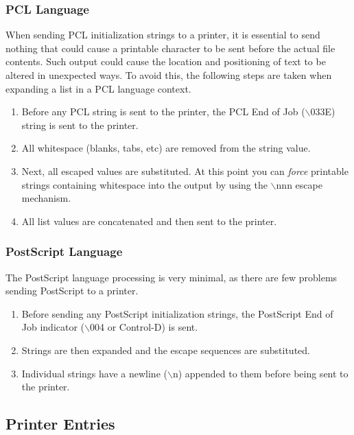 \documentclass[a4paper]{article}
\begin{document}
\subsubsection{PCL Language}

When sending PCL initialization strings to a printer,
it is essential to send nothing that could cause a printable character to
be sent before the actual file contents.
Such output could cause the location and positioning of text to be altered
in unexpected ways.
To avoid this,
the following steps are taken when expanding a list in a PCL language context.
\begin{enumerate}
\item Before any PCL string is sent to the printer,
the PCL End of Job
({\ttfamily $\backslash$033E}) string is sent to the printer.
\item All whitespace (blanks, tabs, etc) are removed from the string value.
\item Next, all escaped values are substituted.
At this point you can
{\itshape force\/}
printable strings containing whitespace into the output by using the
{\ttfamily $\backslash$nnn}
escape mechanism.
\item All list values are concatenated and then sent to the printer.
\end{enumerate}



\subsubsection{PostScript Language}

The PostScript language processing is very minimal,
as there are few problems sending PostScript to a printer.
\begin{enumerate}
\item Before sending any PostScript initialization strings,
the PostScript End of Job indicator
({\ttfamily $\backslash$004} or Control-D) is sent.
\item Strings are then expanded and the escape sequences are substituted.
\item Individual strings have a newline
({\ttfamily $\backslash$n}) appended to them before being sent to the printer.
\end{enumerate}



\subsection{Printer Entries}
\end{document}
